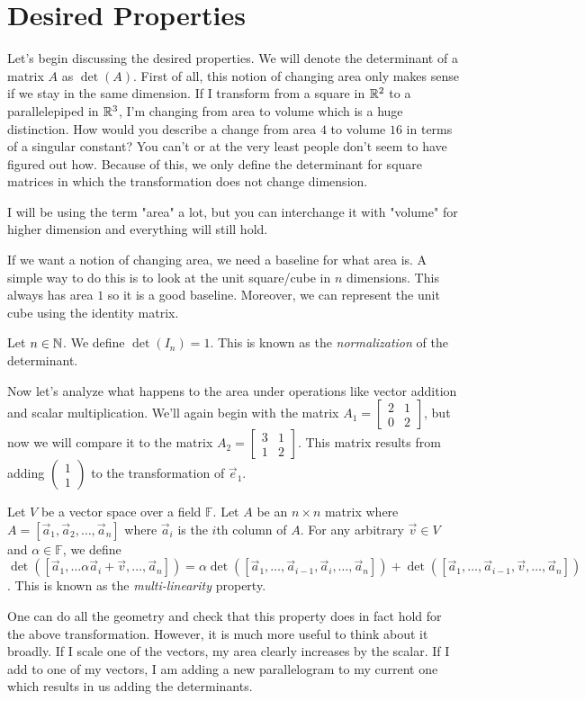 \section{Desired Properties}
Let's begin discussing the desired properties. We will denote the determinant of a matrix $A$ as $\det(A)$. First of all, this notion of changing area only makes sense if we stay in the same dimension. If I transform from a square in $\mathbb{R}^2$ to a parallelepiped in $\mathbb{R}^3$, I'm changing from area to volume which is a huge distinction. How would you describe a change from area $4$ to volume $16$ in terms of a singular constant? You can't or at the very least people don't seem to have figured out how. Because of this, we only define the determinant for square matrices in which the transformation does not change dimension.
\begin{remark}
    I will be using the term "area" a lot, but you can interchange it with "volume" for higher dimension and everything will still hold.
\end{remark}
If we want a notion of changing area, we need a baseline for what area is. A simple way to do this is to look at the unit square/cube in $n$ dimensions. This always has area $1$ so it is a good baseline. Moreover, we can represent the unit cube using the identity matrix.
\begin{definition}
    Let $n\in\mathbb{N}$. We define $\det(I_n)=1$. This is known as the \textit{normalization} of the determinant.
\end{definition}
Now let's analyze what happens to the area under operations like vector addition and scalar multiplication. We'll again begin with the matrix $A_1=\begin{bmatrix}
    2 & 1 \\ 0 & 2
\end{bmatrix}$, but now we will compare it to the matrix $A_2=\begin{bmatrix}
    3 & 1 \\ 1 & 2
\end{bmatrix}$. This matrix results from adding $\begin{pmatrix}
    1 \\ 1
\end{pmatrix}$ to the transformation of $\vec{e}_1$.

\begin{definition}
    Let $V$ be a vector space over a field $\mathbb{F}$. Let $A$ be an $n\times n$ matrix where $A=[\vec{a}_1,\vec{a}_2,\dots,\vec{a}_n]$ where $\vec{a}_i$ is the $i$th column of $A$. For any arbitrary $\vec{v}\in V$ and $\alpha\in\mathbb{F}$, we define $\det([\vec{a}_1,\dots\alpha\vec{a}_i+\vec{v},\dots,\vec{a}_n])=\alpha\det([\vec{a}_1,\dots,\vec{a}_{i-1},\vec{a}_i,\dots,\vec{a}_n])+\det([\vec{a}_1,\dots,\vec{a}_{i-1},\vec{v},\dots,\vec{a}_n])$. This is known as the \textit{multi-linearity} property.
\end{definition}
One can do all the geometry and check that this property does in fact hold for the above transformation. However, it is much more useful to think about it broadly. If I scale one of the vectors, my area clearly increases by the scalar. If I add to one of my vectors, I am adding a new parallelogram to my current one which results in us adding the determinants.

